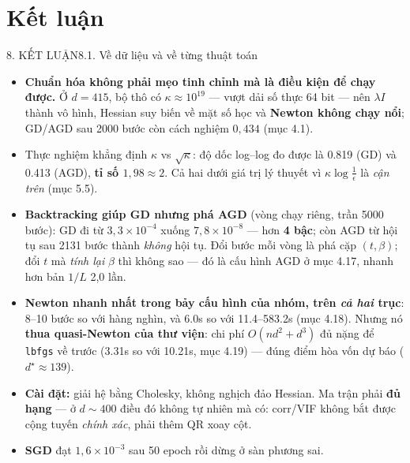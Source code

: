 \documentclass[aspectratio=169,11pt]{beamer}
\begin{document}
\section{Kết luận}

\begin{frame}{8. KẾT LUẬN}{8.1. Về dữ liệu và về từng thuật toán}
  \label{sec:8}%
  \footnotesize
  \begin{itemize}\itemsep=1pt
    \item \textbf{Chuẩn hóa không phải mẹo tinh chỉnh mà là điều kiện để chạy được.} Ở $d=415$,
          bộ thô có $\kappa\approx10^{19}$ --- vượt dải số thực 64 bit --- nên $\lambda I$ thành vô
          hình, Hessian suy biến về mặt số học và \textbf{Newton không chạy nổi}; GD/AGD sau
          \num{2000} bước còn cách nghiệm $0{,}434$ (mục 4.1).
    \item Thực nghiệm khẳng định $\kappa$ vs $\sqrt\kappa$: độ dốc log--log đo được là
          \num{0.819} (GD) và \num{0.413} (AGD), \textbf{tỉ số $1{,}98\approx2$}. Cả hai dưới giá
          trị lý thuyết vì $\kappa\log\frac1\epsilon$ là \emph{cận trên} (mục 5.5).
    \item \textbf{Backtracking giúp GD nhưng phá AGD} (vòng chạy riêng, trần \num{5000} bước): GD
          đi từ $3{,}3\times10^{-4}$ xuống $7{,}8\times10^{-8}$ --- hơn \textbf{4 bậc}; còn AGD từ
          hội tụ sau \num{2131} bước thành \emph{không} hội tụ. Đổi bước mỗi vòng là phá cặp
          $(t,\beta)$; đổi $t$ mà \emph{tính lại} $\beta$ thì không sao --- đó là cấu hình AGD ở
          mục 4.17, nhanh hơn bản $1/L$ 2,0 lần.
    \item \textbf{Newton nhanh nhất trong bảy cấu hình của nhóm, trên \emph{cả hai} trục}: 8--10
          bước so với hàng nghìn, và \num{6.0}s so với \num{11.4}--\num{583.2}s (mục 4.18). Nhưng
          nó \textbf{thua quasi-Newton của thư viện}: chi phí $O(nd^2+d^3)$ đủ nặng để
          \texttt{lbfgs} về trước (\num{3.31}s so với \num{10.21}s, mục 4.19) --- đúng điểm hòa vốn
          dự báo ($d^\star\approx139$).
    \item \textbf{Cài đặt:} giải hệ bằng Cholesky, không nghịch đảo Hessian. Ma trận phải
          \textbf{đủ hạng} --- ở $d\sim400$ điều đó không tự nhiên mà có: corr/VIF không bắt được
          cộng tuyến \emph{chính xác}, phải thêm QR xoay cột.
    \item \textbf{SGD} đạt $1{,}6\times10^{-3}$ sau 50 epoch rồi dừng ở sàn phương sai.
  \end{itemize}
\end{frame}
\end{document}
